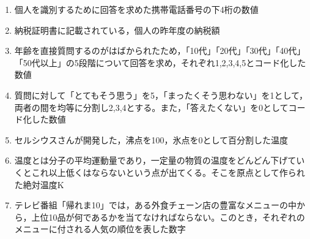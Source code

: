 \begin{enumerate}
	\item 個人を識別するために回答を求めた携帯電話番号の下4桁の数値
	\item 納税証明書に記載されている，個人の昨年度の納税額
	\item 年齢を直接質問するのがはばかられたため，「10代」「20代」「30代」「40代」「50代以上」の5段階について回答を求め，それぞれ1,2,3,4,5とコード化した数値
	\item 質問に対して「とてもそう思う」を5，「まったくそう思わない」を1として，両者の間を均等に分割し2,3,4とする。また，「答えたくない」を0としてコード化した数値
	\item セルシウスさんが開発した，沸点を100，氷点を0として百分割した温度
	\item 温度とは分子の平均運動量であり，一定量の物質の温度をどんどん下げていくとこれ以上低くはならないという点が出てくる。そこを原点として作られた絶対温度K
	\item テレビ番組「帰れま10」では，ある外食チェーン店の豊富なメニューの中から，上位10品が何であるかを当てなければならない。このとき，それぞれのメニューに付される人気の順位を表した数字
\end{enumerate}
